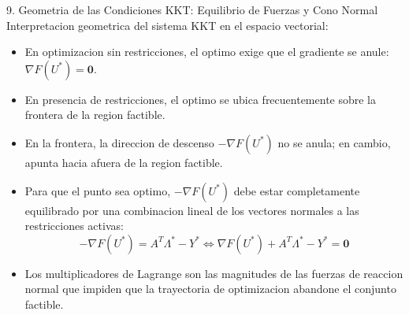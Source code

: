 \documentclass[aspectratio=169,10pt]{beamer}
\begin{document}
\begin{frame}{9. Geometria de las Condiciones KKT: Equilibrio de Fuerzas y Cono Normal}
  Interpretacion geometrica del sistema KKT en el espacio vectorial:
  \vspace{0.3cm}
  \begin{itemize}
    \item En optimizacion sin restricciones, el optimo exige que el gradiente se anule: $\nabla F(U^*) = \mathbf{0}$.
    \vspace{0.2cm}
    \item En presencia de restricciones, el optimo se ubica frecuentemente sobre la frontera de la region factible.
    \vspace{0.2cm}
    \item En la frontera, la direccion de descenso $-\nabla F(U^*)$ no se anula; en cambio, apunta hacia afuera de la region factible.
    \vspace{0.2cm}
    \item Para que el punto sea optimo, $-\nabla F(U^*)$ debe estar completamente equilibrado por una combinacion lineal de los vectores normales a las restricciones activas:
    \begin{equation*}
      -\nabla F(U^*) = A^T \Lambda^* - Y^* \iff \nabla F(U^*) + A^T \Lambda^* - Y^* = \mathbf{0}
    \end{equation*}
    \item Los multiplicadores de Lagrange son las magnitudes de las fuerzas de reaccion normal que impiden que la trayectoria de optimizacion abandone el conjunto factible.
  \end{itemize}
\end{frame}
\end{document}
